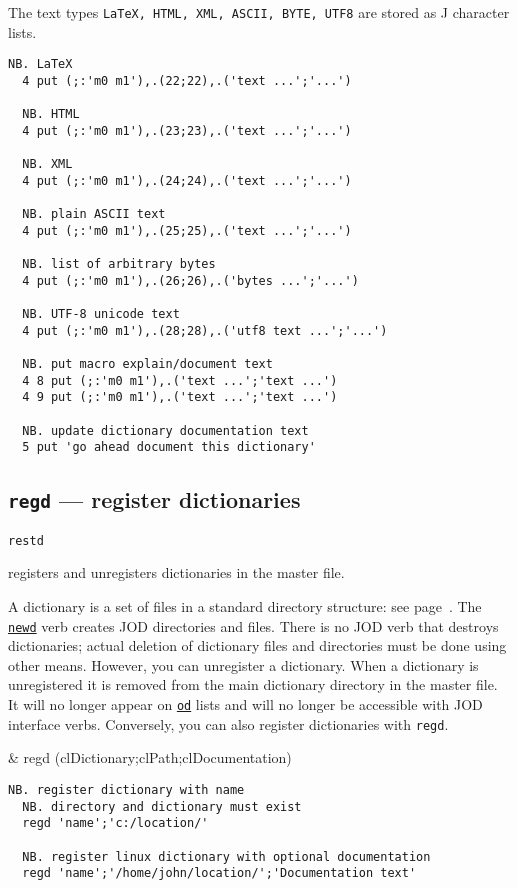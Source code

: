 The text types \texttt{LaTeX, HTML, XML, ASCII,  BYTE, UTF8}
are stored as J character lists. 

\begin{lstlisting}[frame=single,framerule=0pt]   
  NB. LaTeX 
  4 put (;:'m0 m1'),.(22;22),.('text ...';'...') 
  
  NB. HTML 
  4 put (;:'m0 m1'),.(23;23),.('text ...';'...') 

  NB. XML 
  4 put (;:'m0 m1'),.(24;24),.('text ...';'...') 
  
  NB. plain ASCII text 
  4 put (;:'m0 m1'),.(25;25),.('text ...';'...') 
  
  NB. list of arbitrary bytes
  4 put (;:'m0 m1'),.(26;26),.('bytes ...';'...') 
  
  NB. UTF-8 unicode text 
  4 put (;:'m0 m1'),.(28;28),.('utf8 text ...';'...') 

  NB. put macro explain/document text
  4 8 put (;:'m0 m1'),.('text ...';'text ...')
  4 9 put (;:'m0 m1'),.('text ...';'text ...') 
  
  NB. update dictionary documentation text
  5 put 'go ahead document this dictionary'
\end{lstlisting}                  


\subsection{\texttt{regd} --- register dictionaries}\label{ss:regd}

\hypertarget{il:restd}{\texttt{restd}} registers and unregisters 
 dictionaries in the master file.
 
 A dictionary is a set of files in a standard directory structure: see page~\pageref{ss:joddirs}. 
 The \hyperlink{il:newd}{\texttt{newd}} verb creates JOD directories and files.
  There is no JOD verb that destroys dictionaries; actual 
  deletion of dictionary files and directories must be done using 
  other means. However, you can unregister a dictionary. 
  When a dictionary is unregistered it is removed from the main 
  dictionary directory in the master file. It will no longer appear 
  on \hyperlink{il:od}{\texttt{od}} lists and will no longer be accessible with JOD interface verbs. 
  Conversely, you can also register dictionaries with \texttt{regd}. 

\begin{wordhead}
\monad & regd (clDictionary;clPath;clDocumentation) \\
\end{wordhead}
\begin{lstlisting}[frame=single,framerule=0pt] 
  NB. register dictionary with name 
  NB. directory and dictionary must exist
  regd 'name';'c:/location/' 

  NB. register linux dictionary with optional documentation
  regd 'name';'/home/john/location/';'Documentation text' 
\end{lstlisting} 

